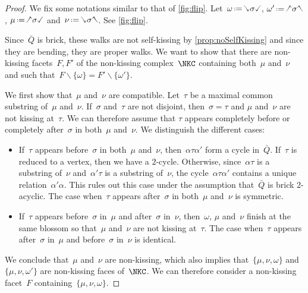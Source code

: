 \documentclass{amsart}
\theoremstyle{definition}
\newcommand{\ssm}{\smallsetminus} %
\newcommand{\eqdef}{\mbox{\,\raisebox{0.2ex}{\scriptsize\ensuremath{\mathrm:}}\ensuremath{=}\,}} %
\newcommand{\quiver}{\bar Q} %
\newcommand{\hL}{\text{\rotatebox[origin=c]{180}{\checked}}}
\newcommand{\hR}{\text{\rotatebox[origin=c]{180}{\reflectbox{\checked}}}}
\newcommand{\cL}{\text{\reflectbox{\checked}}}
\newcommand{\cR}{\text{\checked}}
\newcommand{\hh}[1]{\hL#1\hR} %
\newcommand{\cc}[1]{\cL#1\cR} %
\newcommand{\hc}[1]{\hL#1\cR} %
\newcommand{\ch}[1]{\cL#1\hR} %
\begin{document}
\begin{proof}
We fix some notations similar to that of \cref{fig:flip}.
Let~$\omega \eqdef \cc{\sigma}$, $\omega' \eqdef \hh{\sigma}$, $\mu \eqdef \hc{\sigma}$ and~$\nu \eqdef \ch{\sigma}$.
See \cref{fig:flip}.

Since~$\quiver$ is brick, these walks are not self-kissing by \cref{prop:noSelfKissing} and since they are bending, they are proper walks.
We want to show that there are non-kissing facets~$F, F'$ of the non-kissing complex~$\NKC$ containing both~$\mu$ and~$\nu$ and such that~$F \ssm \{\omega\} = F' \ssm \{\omega'\}$.

We first show that~$\mu$ and~$\nu$ are compatible.
Let~$\tau$ be a maximal common substring of~$\mu$ and~$\nu$.
If~$\sigma$ and~$\tau$ are not disjoint, then~$\sigma = \tau$ and $\mu$ and~$\nu$ are not kissing at~$\tau$.
We can therefore assume that $\tau$ appears completely before or completely after~$\sigma$ in both~$\mu$ and~$\nu$.
We distinguish the different cases:
\begin{itemize}
\item If~$\tau$ appears before~$\sigma$ in both~$\mu$ and~$\nu$, then~$\alpha \tau \alpha'$ form a cycle in~$\quiver$. If~$\tau$ is reduced to a vertex, then we have a $2$-cycle. Otherwise, since~$\alpha\tau$ is a substring of~$\nu$ and~$\alpha'\tau$ is a substring of~$\nu$, the cycle~$\alpha \tau \alpha'$ contains a unique relation~$\alpha'\alpha$. This rules out this case under the assumption that~$\quiver$ is brick $2$-acyclic. The case when~$\tau$ appears after~$\sigma$ in both~$\mu$ and~$\nu$ is symmetric.
\item If~$\tau$ appears before~$\sigma$ in~$\mu$ and after~$\sigma$ in~$\nu$, then~$\omega$, $\mu$ and~$\nu$ finish at the same blossom so that~$\mu$ and~$\nu$ are not kissing at~$\tau$. The case when~$\tau$ appears after~$\sigma$ in~$\mu$ and before~$\sigma$ in~$\nu$ is identical.
\end{itemize}
We conclude that~$\mu$ and~$\nu$ are non-kissing, which also implies that~$\{\mu, \nu, \omega\}$ and~$\{\mu, \nu, \omega'\}$ are non-kissing faces of~$\NKC$.
We can therefore consider a non-kissing facet~$F$ containing~$\{\mu, \nu, \omega\}$.


\end{proof}
\end{document}
